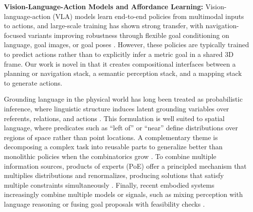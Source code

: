 \noindent\textbf{Vision-Language-Action Models and Affordance Learning:}
Vision-language-action (VLA) models learn end-to-end policies from multimodal inputs to actions, and large-scale training has shown strong transfer, with navigation-focused variants improving robustness through flexible goal conditioning on language, goal images, or goal poses \cite{openx2023rtx,hirose2025omnivla}. However, these policies are typically trained to predict actions rather than to explicitly infer a metric goal in a shared $3$D frame. Our work is novel in that it creates compositional interfaces between a planning or navigation stack, a semantic perception stack, and a mapping stack to generate actions. 

Grounding language in the physical world has long been treated as probabilistic inference, where linguistic structure induces latent grounding variables over referents, relations, and actions \cite{tellex2011symbolgrounding, ijcai2018p810}. This formulation is
well suited to spatial language, where predicates such as ``left of'' or ``near'' define distributions over regions of space rather than point locations. A complementary theme is decomposing a complex task into reusable parts to generalize better than monolithic policies when the combinatorics grow \cite{poco, patil2025factorizingdiffusionpoliciesobservation, du2024compositionalgenerativemodelingsingle}. To combine multiple information sources, products of experts (PoE) offer a principled mechanism that multiplies distributions and renormalizes, producing solutions that satisfy multiple constraints simultaneously \cite{hinton2002poe}. Finally, recent embodied systems increasingly combine multiple models or signals, such as mixing perception with language reasoning or fusing goal proposals with feasibility checks \cite{rana2023sayplan}.


